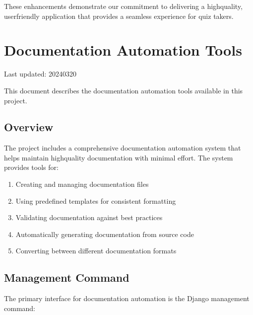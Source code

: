 \documentclass[letterpaper,10pt,english]{sphinxmanual}
\begin{document}
\sphinxAtStartPar
These enhancements demonstrate our commitment to delivering a high\sphinxhyphen{}quality, user\sphinxhyphen{}friendly application
that provides a seamless experience for quiz takers.

\sphinxstepscope


\section{Documentation Automation Tools}
\label{\detokenize{documentation_tools:documentation-automation-tools}}\label{\detokenize{documentation_tools::doc}}
\sphinxAtStartPar
Last updated: 2024\sphinxhyphen{}03\sphinxhyphen{}20

\sphinxAtStartPar
This document describes the documentation automation tools available in this project.


\subsection{Overview}
\label{\detokenize{documentation_tools:overview}}
\sphinxAtStartPar
The project includes a comprehensive documentation automation system that helps maintain high\sphinxhyphen{}quality documentation with minimal effort. The system provides tools for:
\begin{enumerate}
%
\item {} 
\sphinxAtStartPar
Creating and managing documentation files

\item {} 
\sphinxAtStartPar
Using pre\sphinxhyphen{}defined templates for consistent formatting

\item {} 
\sphinxAtStartPar
Validating documentation against best practices

\item {} 
\sphinxAtStartPar
Automatically generating documentation from source code

\item {} 
\sphinxAtStartPar
Converting between different documentation formats

\end{enumerate}


\subsection{Management Command}
\label{\detokenize{documentation_tools:management-command}}
\sphinxAtStartPar
The primary interface for documentation automation is the  Django management command:
\end{document}
